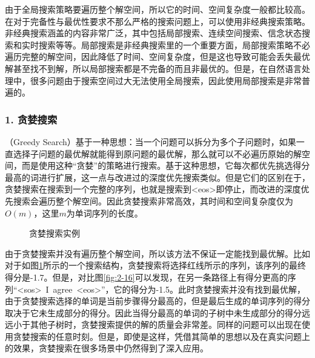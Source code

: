 \parinterval 由于全局搜索策略要遍历整个解空间，所以它的时间、空间复杂度一般都比较高。在对于完备性与最优性要求不那么严格的搜索问题上，可以使用非经典搜索策略。非经典搜索涵盖的内容非常广泛，其中包括局部搜索、连续空间搜索、信念状态搜索和实时搜索等等。局部搜索是非经典搜索里的一个重要方面，局部搜索策略不必遍历完整的解空间，因此降低了时间、空间复杂度，但是这也导致可能会丢失最优解甚至找不到解，所以局部搜索都是不完备的而且非最优的。但是，在自然语言处理中，很多问题由于搜索空间过大无法使用全局搜索，因此使用局部搜索是非常普遍的。


\subsubsection{1. 贪婪搜索}

（Greedy Search）基于一种思想：当一个问题可以拆分为多个子问题时，如果一直选择子问题的最优解就能得到原问题的最优解，那么就可以不必遍历原始的解空间，而是使用这种“贪婪”的策略进行搜索。基于这种思想，它每次都优先挑选得分最高的词进行扩展，这一点与改进过的深度优先搜索类似。但是它们的区别在于，贪婪搜索在搜索到一个完整的序列，也就是搜索到<eos>即停止，而改进的深度优先搜索会遍历整个解空间。因此贪婪搜索非常高效，其时间和空间复杂度仅为$O(m)$，这里$m$为单词序列的长度。

\begin{figure}[htp]
    \centering
 	
	\caption{贪婪搜索实例}
    \label{fig:2-18}
\end{figure}

\parinterval 由于贪婪搜索并没有遍历整个解空间，所以该方法不保证一定能找到最优解。比如对于如图\ref{fig:2-18}所示的一个搜索结构，贪婪搜索将选择红线所示的序列，该序列的最终得分是-1.7。但是，对比图\ref{fig:2-16}可以发现，在另一条路径上有得分更高的序列“<sos>\ I\ agree\ <eos>”，它的得分为-1.5。此时贪婪搜索并没有找到最优解，由于贪婪搜索选择的单词是当前步骤得分最高的，但是最后生成的单词序列的得分取决于它未生成部分的得分。因此当得分最高的单词的子树中未生成部分的得分远远小于其他子树时，贪婪搜索提供的解的质量会非常差。同样的问题可以出现在使用贪婪搜索的任意时刻。但是，即使是这样，凭借其简单的思想以及在真实问题上的效果，贪婪搜索在很多场景中仍然得到了深入应用。

